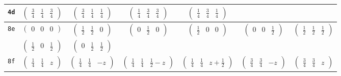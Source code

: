 \documentclass[fleqn,9pt,landscape]{jsarticle}
\begin{document}
\begin{center}
\begin{longtable}{ccccccc}
{\tt 4d} & $ \begin{pmatrix} \frac{3}{4} & \frac{1}{4} & \frac{3}{4} \end{pmatrix} $ & $ \begin{pmatrix} \frac{3}{4} & \frac{1}{4} & \frac{1}{4} \end{pmatrix} $ & $ \begin{pmatrix} \frac{1}{4} & \frac{3}{4} & \frac{3}{4} \end{pmatrix} $ & $ \begin{pmatrix} \frac{1}{4} & \frac{3}{4} & \frac{1}{4} \end{pmatrix} $ & $  $ & $  $ \\ \hline
{\tt 8e} & $ \begin{pmatrix} 0 & 0 & 0 \end{pmatrix} $ & $ \begin{pmatrix} \frac{1}{2} & \frac{1}{2} & 0 \end{pmatrix} $ & $ \begin{pmatrix} 0 & \frac{1}{2} & 0 \end{pmatrix} $ & $ \begin{pmatrix} \frac{1}{2} & 0 & 0 \end{pmatrix} $ & $ \begin{pmatrix} 0 & 0 & \frac{1}{2} \end{pmatrix} $ & $ \begin{pmatrix} \frac{1}{2} & \frac{1}{2} & \frac{1}{2} \end{pmatrix} $ \\
& $ \begin{pmatrix} \frac{1}{2} & 0 & \frac{1}{2} \end{pmatrix} $ & $ \begin{pmatrix} 0 & \frac{1}{2} & \frac{1}{2} \end{pmatrix} $ & $  $ & $  $ & $  $ & $  $ \\ \hline
{\tt 8f} & $ \begin{pmatrix} \frac{1}{4} & \frac{1}{4} & z \end{pmatrix} $ & $ \begin{pmatrix} \frac{1}{4} & \frac{1}{4} & - z \end{pmatrix} $ & $ \begin{pmatrix} \frac{1}{4} & \frac{1}{4} & \frac{1}{2} - z \end{pmatrix} $ & $ \begin{pmatrix} \frac{1}{4} & \frac{1}{4} & z + \frac{1}{2} \end{pmatrix} $ & $ \begin{pmatrix} \frac{3}{4} & \frac{3}{4} & - z \end{pmatrix} $ & $ \begin{pmatrix} \frac{3}{4} & \frac{3}{4} & z \end{pmatrix} $ \\

\end{longtable}
\end{center}
\end{document}
